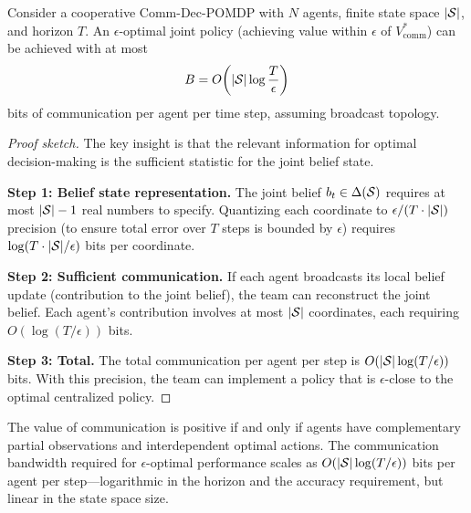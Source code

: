\documentclass[11pt,a4paper]{article}
\begin{document}
\begin{theorem}
\label{thm:comm-complexity}
Consider a cooperative Comm-Dec-POMDP with $N$ agents, finite
state space $|\mathcal{S}|$, and horizon $T$.  An $\epsilon$-optimal
joint policy (achieving value within $\epsilon$ of $V^*_{\mathrm{comm}}$)
can be achieved with at most
\[
  B = O\!\left(|\mathcal{S}| \log \frac{T}{\epsilon}\right)
\]
bits of communication per agent per time step, assuming broadcast
topology.
\end{theorem}

\begin{proof}[Proof sketch]
The key insight is that the relevant information for optimal
decision-making is the sufficient statistic for the joint
belief state.

\textbf{Step 1: Belief state representation.}  The joint belief
$b_t \in \Delta(\mathcal{S})$ requires at most $|\mathcal{S}| - 1$
real numbers to specify.  Quantizing each coordinate to
$\epsilon/(T \cdot |\mathcal{S}|)$ precision (to ensure total error
over $T$ steps is bounded by $\epsilon$) requires
$\log(T \cdot |\mathcal{S}| / \epsilon)$ bits per coordinate.

\textbf{Step 2: Sufficient communication.}  If each agent
broadcasts its local belief update (contribution to the joint
belief), the team can reconstruct the joint belief.  Each
agent's contribution involves at most $|\mathcal{S}|$ coordinates,
each requiring $O(\log(T/\epsilon))$ bits.

\textbf{Step 3: Total.}  The total communication per agent per
step is $O(|\mathcal{S}| \log(T/\epsilon))$ bits.  With this
precision, the team can implement a policy that is
$\epsilon$-close to the optimal centralized policy.
\end{proof}

\begin{keyresult}[title={Conditions for Communication Value}]
The value of communication is positive if and only if agents
have complementary partial observations and interdependent
optimal actions.  The communication bandwidth required for
$\epsilon$-optimal performance scales as $O(|\mathcal{S}|
\log(T/\epsilon))$ bits per agent per step---logarithmic in the
horizon and the accuracy requirement, but linear in the state
space size.
\end{keyresult}
\end{document}
